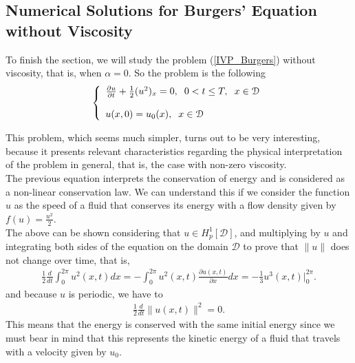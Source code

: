\subsection{Numerical Solutions for Burgers' Equation without Viscosity}
	
	To finish the section, we will study the problem (\ref{IVP_Burgers}) without viscosity, that is, when $\alpha = 0$. So the problem is the following
	\begin{align}
	\label{IVP_Inviscid}
		\left \lbrace \begin{array}{ll}
			\frac{\partial u}{\partial t} + \frac{1}{2} (u^2)_x = 0, \hspace{2mm} 0 < t \leq T, \hspace{2mm} x \in \mathcal{D} \\
			\\
			u(x, 0) = u_0(x), \hspace{2mm} x \in \mathcal{D}
		\end{array}  \right .
	\end{align}

	This problem, which seems much simpler, turns out to be very interesting, because it presents relevant characteristics regarding the physical interpretation of the problem in general, that is, the case with non-zero viscosity. \\
	
	The previous equation interprets the conservation of energy and is considered as a non-linear conservation law. We can understand this if we consider the function $ u $ as the speed of a fluid that conserves its energy with a flow density given by $f(u) = \frac{u^2} {2}$. \\
	
	The above can be shown considering that $u \in H^1_p [\mathcal{D}]$, and multiplying by $u$ and integrating both sides of the equation on the domain $\mathcal{D}$ to prove that $\| u \|$ does not change over time, that is,
	\begin{align*}
		\frac{1}{2} \frac{d}{dt} \displaystyle \int_{0}^{2 \pi} u^2(x, t) dx = - \int_{0}^{2 \pi} u^2(x, t) \frac{\partial u(x, t)}{\partial x} dx = - \frac{1}{3} u^3(x, t) \Big|^{2 \pi}_{0}.
	\end{align*}
	and because $u$ is periodic, we have to
	\begin{align*}
		\frac{1}{2} \frac{d}{dt} \| u(x, t) \|^2 = 0.
	\end{align*}
	This means that the energy is conserved with the same initial energy since we must bear in mind that this represents the kinetic energy of a fluid that travels with a velocity given by $u_0$. \\
		
